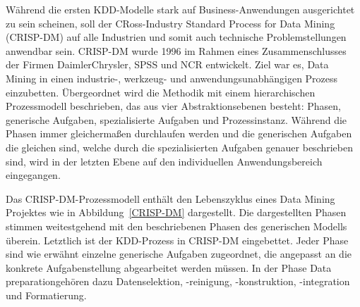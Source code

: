 Während die ersten KDD-Modelle stark auf Business-Anwendungen ausgerichtet zu sein scheinen, soll der CRoss-Industry Standard Process for Data Mining (CRISP-DM) auf alle Industrien und somit auch technische Problemstellungen anwendbar sein. CRISP-DM  wurde 1996 im Rahmen eines Zusammenschlusses der Firmen DaimlerChrysler, SPSS und NCR entwickelt. Ziel war es, Data Mining in einen industrie-, werkzeug- und anwendungsunabhängigen Prozess einzubetten. Übergeordnet wird die Methodik mit einem hierarchischen Prozessmodell beschrieben, das aus vier Abstraktionsebenen besteht: Phasen, generische Aufgaben, spezialisierte Aufgaben und Prozessinstanz. Während die Phasen immer gleichermaßen durchlaufen werden und die generischen Aufgaben die gleichen sind, welche durch die spezialisierten Aufgaben genauer beschrieben sind, wird in der letzten Ebene auf den individuellen Anwendungsbereich eingegangen. \cite{Chapman:2000}

Das CRISP-DM-Prozessmodell enthält den Lebenszyklus eines Data Mining Projektes wie in Abbildung~\ref{CRISP-DM} dargestellt. Die dargestellten Phasen stimmen weitestgehend mit den beschriebenen Phasen des generischen Modells überein. Letztlich ist der KDD-Prozess in CRISP-DM eingebettet. Jeder Phase sind wie erwähnt einzelne generische Aufgaben zugeordnet, die angepasst an die konkrete Aufgabenstellung abgearbeitet werden müssen. In der Phase \glqq Data preparation\grqq gehören dazu Datenselektion, -reinigung, -konstruktion, -integration und Formatierung. \cite{Chapman:2000}


